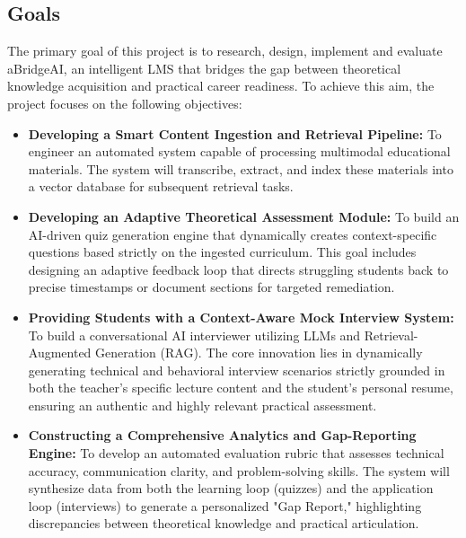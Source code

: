 \subsection{Goals}

\noindent The primary goal of this project is to research, design, implement and evaluate aBridgeAI, an intelligent LMS that bridges the gap between theoretical knowledge acquisition and practical career readiness. To achieve this aim, the project focuses on the following objectives:

\begin{itemize}
    \item \textbf{Developing a Smart Content Ingestion and Retrieval Pipeline:} To engineer an automated system capable of processing multimodal educational materials. The system will transcribe, extract, and index these materials into a vector database for subsequent retrieval tasks.
    
    \item \textbf{Developing an Adaptive Theoretical Assessment Module:} To build an AI-driven quiz generation engine that dynamically creates context-specific questions based strictly on the ingested curriculum. This goal includes designing an adaptive feedback loop that directs struggling students back to precise timestamps or document sections for targeted remediation.
    
    \item \textbf{Providing Students with a Context-Aware Mock Interview System:} To build a conversational AI interviewer utilizing LLMs and Retrieval-Augmented Generation (RAG). The core innovation lies in dynamically generating technical and behavioral interview scenarios strictly grounded in both the teacher's specific lecture content and the student's personal resume, ensuring an authentic and highly relevant practical assessment.
    
    \item \textbf{Constructing a Comprehensive Analytics and Gap-Reporting Engine:} To develop an automated evaluation rubric that assesses technical accuracy, communication clarity, and problem-solving skills. The system will synthesize data from both the learning loop (quizzes) and the application loop (interviews) to generate a personalized "Gap Report," highlighting discrepancies between theoretical knowledge and practical articulation.
\end{itemize}